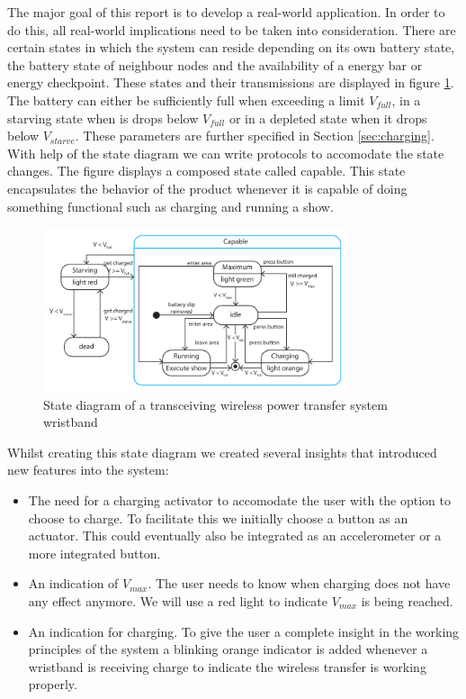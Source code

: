 %
The major goal of this report is to develop a real-world application. In order to do this, all real-world implications need to be taken into consideration. There are certain states in which the system can reside depending on its own battery state, the battery state of neighbour nodes and the availability of a energy bar or energy checkpoint. These states and their transmissions are displayed in figure \ref{fig:states}. The battery can either be sufficiently full when exceeding a limit $V_{full}$, in a starving state when is drops below $V_{full}$ or in a depleted state when it drops below  $V_{starve}$. These parameters are further specified in Section \ref{sec:charging}. With help of the state diagram we can write protocols to accomodate the state changes. The figure displays a composed state called capable. This state encapsulates the behavior of the product whenever it is capable of doing something functional such as charging and running a show. 

\begin{figure}[h!]
\centering
\includegraphics[width=0.8\textwidth]{statediagram.pdf}
\caption{State diagram of a transceiving wireless power transfer system wristband}
\label{fig:states}
\end{figure}

Whilst creating this state diagram we created several insights that introduced new features into the system:
\begin{itemize}
	\item The need for a charging activator to accomodate the user with the option to choose to charge. To facilitate this we initially choose a button as an actuator. This could eventually also be integrated as an accelerometer or a more integrated button. 
	\item An indication of $V_{max}$. The user needs to know when charging does not have any effect anymore. We will use a red light to indicate $V_{max}$ is being reached. 
	\item An indication for charging. To give the user a complete insight in the working principles of the system a blinking orange indicator is added whenever a wristband is receiving charge to indicate the wireless transfer is working properly. 
\end{itemize}

